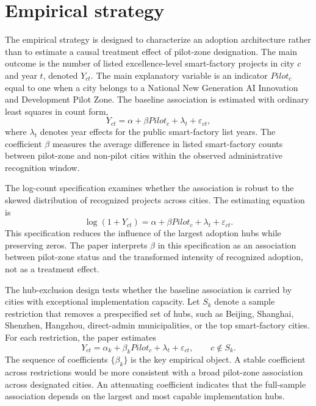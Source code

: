 
\section{Empirical strategy}
\label{sec:empirical_strategy}

The empirical strategy is designed to characterize an adoption architecture rather than to estimate a causal treatment effect of pilot-zone designation. The main outcome is the number of listed excellence-level smart-factory projects in city $c$ and year $t$, denoted $Y_{ct}$. The main explanatory variable is an indicator $Pilot_c$ equal to one when a city belongs to a National New Generation AI Innovation and Development Pilot Zone. The baseline association is estimated with ordinary least squares in count form,
\begin{equation}
Y_{ct} = \alpha + \beta Pilot_c + \lambda_t + \varepsilon_{ct},
\label{eq:baseline_count}
\end{equation}
where $\lambda_t$ denotes year effects for the public smart-factory list years. The coefficient $\beta$ measures the average difference in listed smart-factory counts between pilot-zone and non-pilot cities within the observed administrative recognition window.

The log-count specification examines whether the association is robust to the skewed distribution of recognized projects across cities. The estimating equation is
\begin{equation}
\log(1 + Y_{ct}) = \alpha + \beta Pilot_c + \lambda_t + \varepsilon_{ct}.
\label{eq:baseline_log}
\end{equation}
This specification reduces the influence of the largest adoption hubs while preserving zeros. The paper interprets $\beta$ in this specification as an association between pilot-zone status and the transformed intensity of recognized adoption, not as a treatment effect.

The hub-exclusion design tests whether the baseline association is carried by cities with exceptional implementation capacity. Let $S_k$ denote a sample restriction that removes a prespecified set of hubs, such as Beijing, Shanghai, Shenzhen, Hangzhou, direct-admin municipalities, or the top smart-factory cities. For each restriction, the paper estimates
\begin{equation}
Y_{ct} = \alpha_k + \beta_k Pilot_c + \lambda_t + \varepsilon_{ct}, \qquad c \notin S_k.
\label{eq:hub_exclusion}
\end{equation}
The sequence of coefficients $\{\beta_k\}$ is the key empirical object. A stable coefficient across restrictions would be more consistent with a broad pilot-zone association across designated cities. An attenuating coefficient indicates that the full-sample association depends on the largest and most capable implementation hubs.

